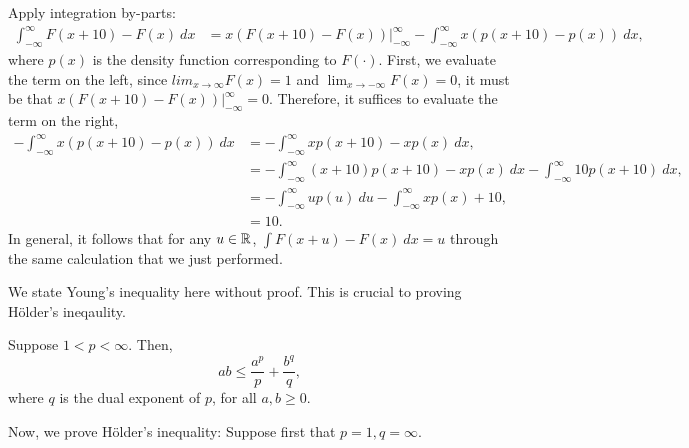 \begin{problem}{9}
\end{problem}
\begin{solution}
    Apply integration by-parts:
    \begin{align*}
        \int_{-\infty}^\infty F(x+10) - F(x)~dx &= x(F(x+10) - F(x)) \Big\vert_{-\infty}^\infty - \int_{-\infty}^\infty x(p(x+10) - p(x))~dx, 
    \end{align*}
    where $p(x)$ is the density function corresponding to $F(\cdot)$. First, we evaluate the term on the left, since $lim_{x\to\infty} F(x) = 1$ and $\lim_{x\to-\infty} F(x) = 0$, it must be that $x(F(x+10) - F(x)) \Big\vert_{-\infty}^\infty = 0$. Therefore, it suffices to evaluate the term on the right, 
    \begin{align*}
        -\int_{-\infty}^\infty x(p(x+10) - p(x))~dx &= -\int_{-\infty}^\infty xp(x+10) - xp(x)~dx, \\
        &= -\int_{-\infty}^\infty (x+10)p(x+10) - xp(x)~dx - \int_{-\infty}^\infty 10p(x+10)~dx, \\
        &= -\int_{-\infty}^\infty up(u)~du - \int_{-\infty}^\infty xp(x) + 10, \\
        &= 10.
    \end{align*}
    In general, it follows that for any $u \in \mathbb{R}$, $\int F(x + u) - F(x)~dx = u$ through the same calculation that we just performed. 
\end{solution}

\begin{problem}{10}
\end{problem}
\begin{solution}
\end{solution}

\begin{problem}{11}
\end{problem}
\begin{solution}
\end{solution}

\begin{problem}{12}
\end{problem}
\begin{solution}
    We state Young's inequality here without proof. This is crucial to proving Hölder's ineqaulity.
    \begin{theorem}
        Suppose $1 < p < \infty$. Then, 
        \[
            ab \leq \frac{a^p}{p} + \frac{b^{q}}{q},  
        \]
        where $q$ is the dual exponent of $p$, for all $a, b \geq 0$.
    \end{theorem}
    Now, we prove Hölder's inequality:
    Suppose first that $p=1,q=\infty$. 
\end{solution}

\begin{problem}{13}
\end{problem}
\begin{solution}
\end{solution}